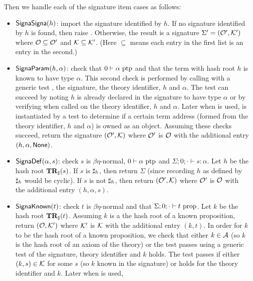\begin{itemize}
Then we handle each of the signature item cases as follows:
\begin{itemize}
\item $\mbox{\constr{SignaSigna}}(h)$: import the signature identified by $h$.
If no signature identified by $h$ is found, then raise {}.
Otherwise, the result is a signature $\Sigma'=(\mathcal{O}',\mathcal{K}')$ where $\mathcal{O} \subseteq \mathcal{O}'$
and $\mathcal{K} \subseteq \mathcal{K}'$. (Here $\subseteq$ means each entry in the first list is an entry in the second.)
\item $\mbox{\constr{SignaParam}}(h,\alpha)$: check that $0\vdash \alpha~\mbox{ptp}$
and that the term with hash root $h$ is known to have type $\alpha$.
This second check is performed by calling {} with a generic test {},
the signature, the theory identifier, $h$ and $\alpha$.
The test can succeed by noting $h$ is already declared in the signature to have type $\alpha$
or by verifying {} when called on the theory identifier, $h$ and $\alpha$.
Later when {} is used, {}
is instantiated by a test to determine if a certain term address (formed from the theory identifier,
$h$ and $\alpha$) is owned as an object.
Assuming these checks succeed, return the signature $(\mathcal{O}',\mathcal{K})$
where $\mathcal{O}'$ is $\mathcal{O}$ with the additional entry $(h,\alpha,\val{None})$.
\item $\mbox{\constr{SignaDef}}(\alpha,s)$: check $s$ is $\beta\eta$-normal,
$0\vdash \alpha~\mbox{ptp}$
and $\Sigma;0;\cdot\vdash s:\alpha$.
Let $h$ be the hash root $\mathbf{TR}_{\sharp}(s)$.
If $s$ is $\mathbf{\sharp}_{h}$, then return $\Sigma$ (since recording $h$ as defined by $\mathbf{\sharp}_{h}$ would be cyclic).
If $s$ is not $\mathbf{\sharp}_{h}$, then return 
$(\mathcal{O}',\mathcal{K})$
where $\mathcal{O}'$ is $\mathcal{O}$ with the additional entry $(h,\alpha,s)$.
\item $\mbox{\constr{SignaKnown}}(t)$: check $t$ is $\beta\eta$-normal
and that $\Sigma;0;\cdot\vdash t ~\mbox{prop}$.
Let $k$ be the hash root $\mathbf{TR}_{\sharp}(t)$.
Assuming $k$ is a the hash root of a known proposition, return $(\mathcal{O},\mathcal{K}')$ where $\mathcal{K}'$ is $\mathcal{K}$
with the additional entry $(k,t)$.
In order for $k$ to be the hash root of a known proposition, we check that 
either $k\in \mathcal{A}$ (so $k$ is the hash root of an axiom of the theory)
or the test {} passes using a generic test {} of the signature, theory identifier and $k$ holds.
The test {} passes if either $(k,s)\in\mathcal{K}$ for some $s$ (so $k$ known in the signature)
or {} holds for the theory identifier and $k$.
Later when {} is used, {}

\end{itemize}
\end{itemize}
